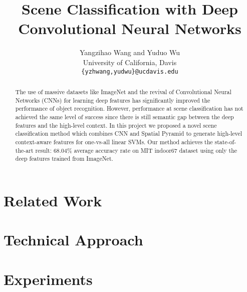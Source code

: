 \documentclass[10pt,twocolumn,letterpaper]{article}
\begin{document}
\title{Scene Classification with Deep Convolutional Neural Networks}

\author{Yangzihao Wang and Yuduo Wu\\
University of California, Davis\\
{\tt\small \{yzhwang,yudwu\}@ucdavis.edu}
}

\maketitle

\begin{abstract}
The use of massive datasets like ImageNet and the revival of Convolutional
Neural Networks (CNNs) for learning deep features has significantly improved
the performance of object recognition. However, performance at scene
classification has not achieved the same level of success since there is still
semantic gap between the deep features and the high-level context.  In this
project we proposed a novel scene classification method which combines CNN and
Spatial Pyramid to generate high-level context-aware features for one-vs-all
linear SVMs. Our method achieves the state-of-the-art result: 68.04\% average
accuracy rate on MIT indoor67 dataset using only the deep features trained from
ImageNet.

\end{abstract}

\section{Related Work}
\label{sec:related}


\section{Technical Approach}
\label{sec:method}


\section{Experiments}
\label{sec:results}

\end{document}
